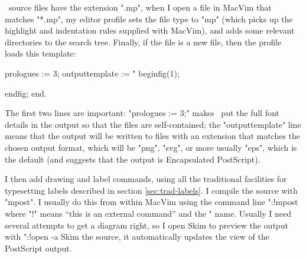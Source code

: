 \documentclass[a4paper,landscape]{article}
\begin{document}
\MP\ source files have the extension ".mp", when I open a file in MacVim that
matches "*.mp", my editor profile sets the file type to "mp" (which picks up the
highlight and indentation rules supplied with MacVim), and adds some relevant
directories to the search tree.  Finally, if the file is a new file, then the
profile loads this template:
\begin{smallcode}
prologues := 3;
outputtemplate := "%
beginfig(1);

endfig;
end.
\end{smallcode}
The first two lines are important: "prologues := 3;" makes \MP\ put the full font
details in the output so that the files are self-contained; the "outputtemplate"
line means that the output will be written to files with an extension that matches
the chosen output format, which will be "png", "svg", or more usually "eps", which
is the default (and suggests that the output is Encapsulated PostScript).

I then add drawing and label commands, using all the traditional facilities for
typesetting labels described in section \ref{sec:trad-labels}.  I compile the source
with "mpost". I usually do this from within MacVim using the command line ":!mpost %
where "!" means “this is an external command” and the "%
name.  Usually I need several attempts to get a diagram right, so I open Skim to preview the
output with ":!open -a Skim %
the source, it automatically updates the view of the PostScript output.
\end{document}
